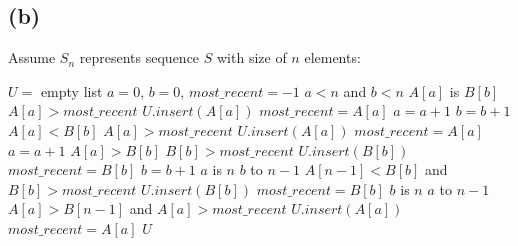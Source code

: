     \begin{spacing}{1.1}
    \subsection{(b)}
        Assume $S_n$ represents sequence $S$ with size of $n$ elements:
        \begin{codebox}
            \li $U =$ empty list
            \li $a = 0$, $b = 0$, $most\_recent = -1$
            \li \While $a < n$ and $b<n$
                \Do
                    \li \If $A[a]$ is $B[b]$
                    \Then
                        \li \If $A[a] > most\_recent$
                        \Then
                            \li $U.insert(A[a])$
                            \li $most\_recent = A[a]$
                        \End
                        \li $a = a + 1$
                        \li $b = b + 1$
                    \li \ElseIf $A[a] < B[b]$
                    \Then
                        \li \If $A[a] > most\_recent$
                        \Then
                            \li $U.insert(A[a])$
                            \li $most\_recent = A[a]$
                        \End
                        \li $a = a + 1$
                    \li \ElseIf $A[a] > B[b]$
                    \Then
                    \li \If $B[b] > most\_recent$
                        \Then
                            \li $U.insert(B[b])$
                            \li $most\_recent = B[b]$
                        \End
                        \li $b = b + 1$
                    \End 
                \End
            \li \If $a$ is $n$
            \Then
                \li \For $b$ to $n-1$
                \Then
                    \li \If $A[n-1]<B[b]$ and $B[b]>most\_recent$
                    \Then
                        \li $U.insert(B[b])$
                        \li $most\_recent = B[b]$
                    \End
                \End
            \li \ElseIf $b$ is $n$
            \Then
                \li \For $a$ to $n-1$
                \Then
                    \li \If $A[a]>B[n-1]$ and $A[a]>most\_recent$
                    \Then
                        \li $U.insert(A[a])$
                        \li $most\_recent = A[a]$
                    \End
                \End
            \End
            \li \Return $U$
        \end{codebox}
    \end{spacing}

